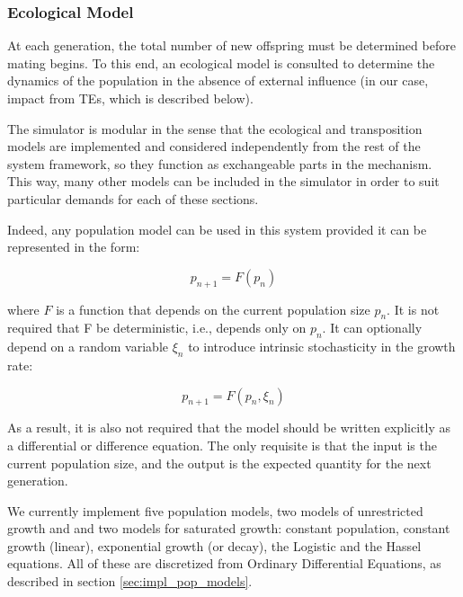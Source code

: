 \documentclass[10pt]{article}
\begin{document}
\subsubsection{Ecological Model}

At each generation, the total number of new offspring must be
determined before mating begins. To this end, an ecological model is
consulted to determine the dynamics of the population in the absence
of external influence (in our case, impact from TEs, which is
described below).

The simulator is modular in the sense that the ecological and
transposition models are implemented and considered independently from
the rest of the system framework, so they function as exchangeable
parts in the mechanism. This way, many other models can be included in
the simulator in order to suit particular demands for each of these
sections. 

Indeed, any population model can be used in this system provided it
can be represented in the form:

\begin{equation}
  p_{n+1} = F(p_n)
\end{equation}

where $F$ is a function that depends on the current population size
$p_n$. It is not required that F be deterministic, i.e., depends only
on $p_n$. It can optionally depend on a random variable $\xi_n$ to
introduce intrinsic stochasticity in the growth rate:

\begin{equation}
  p_{n+1} = F(p_n,\xi_n)
\end{equation}

As a result, it is also not required that the model should be written
explicitly as a differential or difference equation. The only
requisite is that the input is the current population size, and the
output is the expected quantity for the next generation.

We currently implement five population models, two models of
unrestricted growth and and two models for saturated growth: constant
population, constant growth (linear), exponential growth (or decay),
the Logistic and the Hassel \cite{Has75} equations. All of these are
discretized from Ordinary Differential Equations, as described in
section \ref{sec:impl_pop_models}.


\end{document}
